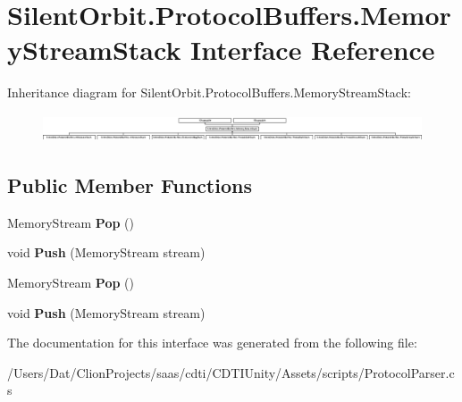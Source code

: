 \hypertarget{interface_silent_orbit_1_1_protocol_buffers_1_1_memory_stream_stack}{}\section{Silent\+Orbit.\+Protocol\+Buffers.\+Memory\+Stream\+Stack Interface Reference}
\label{interface_silent_orbit_1_1_protocol_buffers_1_1_memory_stream_stack}
Inheritance diagram for Silent\+Orbit.\+Protocol\+Buffers.\+Memory\+Stream\+Stack\+:\begin{figure}[H]
\begin{center}
\leavevmode
\includegraphics[height=0.821918cm]{interface_silent_orbit_1_1_protocol_buffers_1_1_memory_stream_stack}
\end{center}
\end{figure}
\subsection*{Public Member Functions}
\begin{DoxyCompactItemize}
\item 
Memory\+Stream {\bfseries Pop} ()\hypertarget{interface_silent_orbit_1_1_protocol_buffers_1_1_memory_stream_stack_a7408e30789e2d7ee77cd166e69b98a48}{}\label{interface_silent_orbit_1_1_protocol_buffers_1_1_memory_stream_stack_a7408e30789e2d7ee77cd166e69b98a48}

\item 
void {\bfseries Push} (Memory\+Stream stream)\hypertarget{interface_silent_orbit_1_1_protocol_buffers_1_1_memory_stream_stack_a1ae64da82a0acdfaaec81a0697d3c070}{}\label{interface_silent_orbit_1_1_protocol_buffers_1_1_memory_stream_stack_a1ae64da82a0acdfaaec81a0697d3c070}

\item 
Memory\+Stream {\bfseries Pop} ()\hypertarget{interface_silent_orbit_1_1_protocol_buffers_1_1_memory_stream_stack_a7408e30789e2d7ee77cd166e69b98a48}{}\label{interface_silent_orbit_1_1_protocol_buffers_1_1_memory_stream_stack_a7408e30789e2d7ee77cd166e69b98a48}

\item 
void {\bfseries Push} (Memory\+Stream stream)\hypertarget{interface_silent_orbit_1_1_protocol_buffers_1_1_memory_stream_stack_a1ae64da82a0acdfaaec81a0697d3c070}{}\label{interface_silent_orbit_1_1_protocol_buffers_1_1_memory_stream_stack_a1ae64da82a0acdfaaec81a0697d3c070}

\end{DoxyCompactItemize}


The documentation for this interface was generated from the following file\+:\begin{DoxyCompactItemize}
\item 
/\+Users/\+Dat/\+Clion\+Projects/saas/cdti/\+C\+D\+T\+I\+Unity/\+Assets/scripts/Protocol\+Parser.\+cs\end{DoxyCompactItemize}
